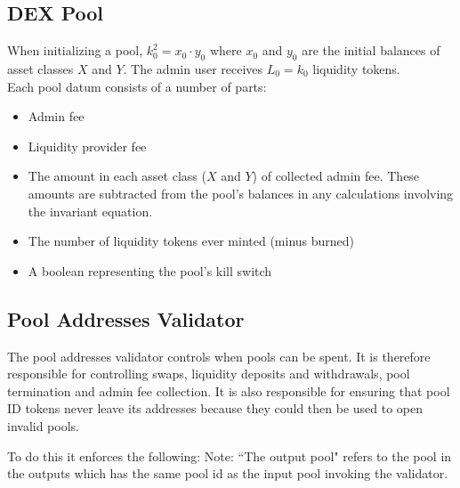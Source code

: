 \documentclass{article}
\begin{document}
\subsection{DEX Pool}

When initializing a pool, $k_0^2 = x_0 \cdot y_0$ where $x_0$ and $y_0$ are the
initial balances of asset classes $X$ and $Y$. The admin user receives $L_0 =
k_0$ liquidity tokens. \\

Each pool datum consists of a number of parts:
\begin{itemize}
  \item Admin fee
  \item Liquidity provider fee
  \item The amount in each asset class ($X$ and $Y$) of collected admin fee.
    These amounts are subtracted from the pool's balances in any calculations
    involving the invariant equation.
  \item The number of liquidity tokens ever minted (minus burned)
  \item A boolean representing the pool's kill switch
\end{itemize}

\subsection{Pool Addresses Validator}

The pool addresses validator controls when pools can be spent.
It is therefore responsible for controlling swaps,
liquidity deposits and withdrawals, pool termination
and admin fee collection.
It is also responsible for ensuring that
pool ID tokens never leave its addresses
because they could then be used to open invalid pools.

To do this it enforces the following:
Note: ``The output pool" refers to
the pool in the outputs which has the same pool id
as the input pool invoking the validator.
\end{document}
